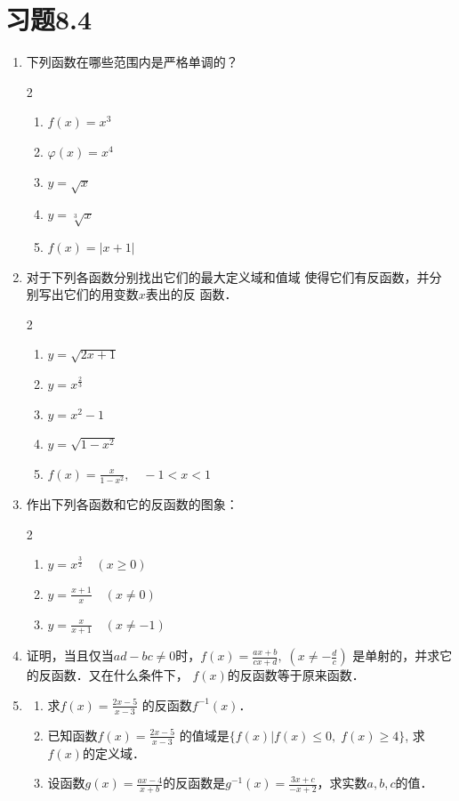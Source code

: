 \section*{习题8.4}
\begin{enumerate}
\item 下列函数在哪些范围内是严格单调的？
\begin{multicols}{2}
  \begin{enumerate}
    \item $f(x)=x^3$
    \item $\varphi(x)=x^4$
    \item $y=\sqrt{x}$
    \item $y=\sqrt[3]{x}$
    \item $f(x)=|x+1|$
\end{enumerate}  
\end{multicols}


\item 对于下列各函数分别找出它们的最大定义域和值域
使得它们有反函数，并分别写出它们的用变数$x$表出的反
函数．
\begin{multicols}{2}
    \begin{enumerate}
      \item $y=\sqrt{2x+1}$
      \item $y=x^{\tfrac{2}{3}}$
      \item $y=x^2-1$
      \item $y=\sqrt{1-x^2}$
      \item $f(x)=\frac{x}{1-x^2},\quad -1<x<1$
  \end{enumerate}  
  \end{multicols}

\item 作出下列各函数和它的反函数的图象：
\begin{multicols}{2}
    \begin{enumerate}
      \item $y=x^{\tfrac{3}{2}}\quad (x\ge 0)$
      \item $y=\frac{x+1}{x}\quad (x\ne 0)$
      \item $y=\frac{x}{x+1}\quad (x\ne -1)$
  \end{enumerate}  
  \end{multicols}

\item 证明，当且仅当$ad-bc\ne 0$时，$f(x)=\frac{ax+b}{cx+d},\; \left(x\ne -\frac{d}{c}\right)$
是单射的，并求它的反函数．又在什么条件下，
$f(x)$的反函数等于原来函数．
\item \begin{enumerate}
\item 求$f(x)=\frac{2x-5}{x-3}$
的反函数$f^{-1}(x)$．
\item 已知函数$f(x)=\frac{2x-5}{x-3}$
的值域是$\{f(x)|f(x)\le 0,\; f(x)\ge 4\}$, 求$f(x)$的定义域．
\item 设函数$g(x)=\frac{ax-4}{x+b}$的反函数是$g^{-1}(x)=\frac{3x+c}{-x+2}$，求实数$a,b,c$的值．
\end{enumerate}


\end{enumerate}
